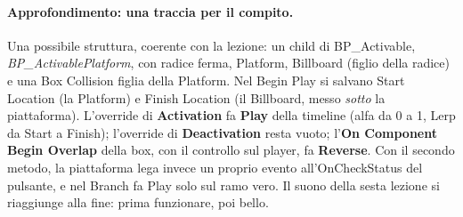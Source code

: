 \paragraph{Approfondimento: una traccia per il compito.} Una possibile struttura, coerente
con la lezione: un child di BP\_Activable, \emph{BP\_ActivablePlatform}, con radice
ferma, Platform, Billboard (figlio della radice) e una Box Collision figlia della
Platform. Nel Begin Play si salvano Start Location (la Platform) e Finish Location (il
Billboard, messo \emph{sotto} la piattaforma). L'override di \textbf{Activation} fa
\textbf{Play} della timeline (alfa da 0 a 1, Lerp da Start a Finish); l'override di
\textbf{Deactivation} resta vuoto; l'\textbf{On Component Begin Overlap} della box, con
il controllo sul player, fa \textbf{Reverse}. Con il secondo metodo, la piattaforma lega
invece un proprio evento all'OnCheckStatus del pulsante, e nel Branch fa Play solo sul
ramo vero. Il suono della sesta lezione si riaggiunge alla fine: prima funzionare, poi
bello.

